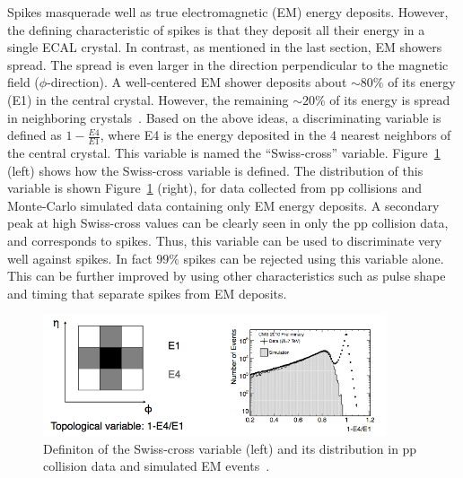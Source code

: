 Spikes masquerade well as true electromagnetic (EM) energy deposits. However, the defining characteristic of spikes is that they deposit all their energy in a single ECAL crystal. In contrast, as mentioned in the last section, EM showers spread. The spread is even larger in the direction perpendicular to the magnetic field ($\phi$-direction). A well-centered EM shower deposits about $\sim80\%$ of its energy (E1) in the central crystal. However, the remaining $\sim20\%$ of its energy is spread in neighboring crystals~\cite{petyt}. Based on the above ideas, a discriminating variable is defined as $1-\frac{E4}{E1}$, where E4 is the energy deposited in the 4 nearest neighbors of the central crystal. This variable is named the ``Swiss-cross'' variable. Figure~\ref{fig:swisscross} (left) shows how the Swiss-cross variable is defined. The distribution of this variable is shown Figure~\ref{fig:swisscross} (right), for data collected from pp collisions and Monte-Carlo simulated data containing only EM energy deposits. A secondary peak at high Swiss-cross values can be clearly seen in only the pp collision data, and corresponds to spikes. Thus, this variable can be used to discriminate very well against spikes. In fact $99\%$ spikes can be rejected using this variable alone. This can be further improved by using other characteristics such as pulse shape and timing that separate spikes from EM deposits.


\begin{figure}
\begin{center}
  \includegraphics[width=0.9\textwidth,keepaspectratio]{plots_and_figures/chapter3/swisscross.png}
\caption{Definiton of the Swiss-cross variable (left) and its distribution in pp collision data and simulated EM events~\cite{petyt}.}
\label{fig:swisscross}
\end{center}
\end{figure}


